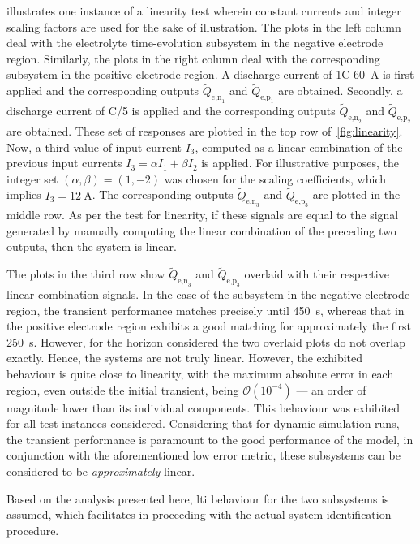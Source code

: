   illustrates  one  instance  of a  linearity  test  wherein
constant  currents  and  integer  scaling  factors are  used  for  the  sake  of
illustration.  The  plots   in  the  left  column  deal   with  the  electrolyte
time-evolution  subsystem  in  the  negative electrode  region.  Similarly,  the
plots  in  the  right  column  deal with  the  corresponding  subsystem  in  the
positive electrode region.  A discharge current of 1C  \ie{} \SI{60}{\ampere} is
first  applied  and  the  corresponding  outputs  $\widetilde{Q}_{\text{e,n}_1}$
and   $\widetilde{Q}_{\text{e,p}_1}$  are   obtained.   Secondly,  a   discharge
current   of   C/5   \ie{}   is    applied   and   the   corresponding   outputs
$\widetilde{Q}_{\text{e,n}_2}$ and  $\widetilde{Q}_{\text{e,p}_2}$ are obtained.
These set of responses are plotted  in the top row of~\cref{fig:linearity}. Now,
a  third  value  of  input  current $I_3$,  computed  as  a  linear  combination
of  the  previous  input  currents  \ie{}  $I_3 =  \alpha  I_1  +  \beta  I_2  $
is  applied.  For  illustrative  purposes, the  integer  set  $(\alpha,\beta)  =
(1,-2)$  was  chosen  for  the   scaling  coefficients,  which  implies  $I_3  =
\SI{12}{\ampere}$. The corresponding  outputs $\widetilde{Q}_{\text{e,n}_3}$ and
$\widetilde{Q}_{\text{e,p}_3}$ are  plotted in the  middle row. As per  the test
for linearity,  if these signals are  equal to the signal  generated by manually
computing the linear  combination of the preceding two outputs,  then the system
is linear.

The   plots   in  the   third   row   show  $\widetilde{Q}_{\text{e,n}_3}$   and
$\widetilde{Q}_{\text{e,p}_3}$ overlaid with their respective linear combination
signals. In  the case  of the  subsystem in the  negative electrode  region, the
transient performance matches  precisely until \approx\SI{450}{\second}, whereas
that in the positive electrode region exhibits a good matching for approximately
the  first  \SI{250}{\second}.  However,  for the  horizon  considered  the  two
overlaid plots do not overlap exactly.  Hence, the systems are not truly linear.
However, the exhibited  behaviour is quite close to linearity,  with the maximum
absolute  error  in each  region,  even  outside  the initial  transient,  being
$\mathcal{O}(10^{-4})$  --- an  order  of magnitude  lower  than its  individual
components.  This behaviour  was exhibited  for all  test instances  considered.
Considering  that for  dynamic  simulation runs,  the  transient performance  is
paramount  to  the good  performance  of  the  model,  in conjunction  with  the
aforementioned  low error  metric,  these  subsystems can  be  considered to  be
\emph{approximately} linear.

Based  on  the  analysis  presented   here,  \gls{lti}  behaviour  for  the  two
subsystems is  assumed, which facilitates  in proceeding with the  actual system
identification procedure.


